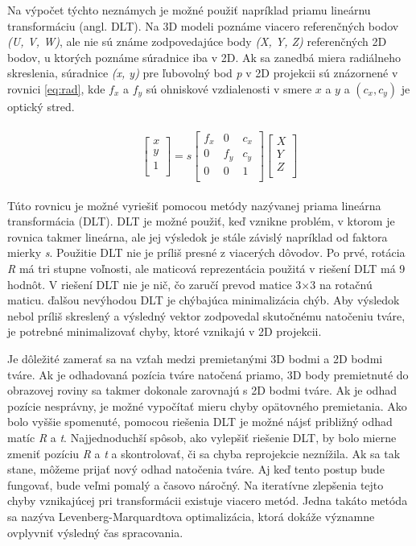 \documentclass[slovak,master,dept460,male,cpp,cpdeclaration]{diploma}
\begin{document}
Na výpočet týchto neznámych je možné použiť napríklad  priamu lineárnu transformáciu (angl. DLT). Na 3D modeli poznáme viacero referenčných bodov \textit{(U, V, W)}, ale  nie sú známe zodpovedajúce body \textit{(X, Y, Z)} referenčných 2D bodov, u ktorých poznáme súradnice iba v 2D. Ak sa zanedbá miera radiálneho skreslenia, súradnice  \textit{(x, y)} pre ľubovolný bod \textit{p} v 2D projekcii sú znázornené v rovnici \ref{eq:rad}, kde $f_x$ a $f_y$ sú ohniskové vzdialenosti v smere $x$ a $y$ a $(c_x, c_y)$ je optický stred.


\begin{eqnarray}
\begin{split}
&\ \ \ \ \begin{bmatrix}
x\\ 
y\\ 
1\\
\end{bmatrix}
=  s
\begin{bmatrix}
f_{x} & 0 & c_{x}\\ 
0 & f_{y} & c_{y}\\ 
0 & 0 & 1 \\
\end{bmatrix}
\begin{bmatrix}
X\\ 
Y\\ 
Z\\
\end{bmatrix}
\label{eq:rad}
\end{split}
\end{eqnarray}

Túto rovnicu je možné vyriešiť pomocou metódy nazývanej priama lineárna transformácia (DLT). DLT je možné použiť, keď vznikne problém, v ktorom je rovnica takmer lineárna, ale jej výsledok je stále závislý napríklad od faktora mierky \textit{s}. Použitie DLT nie je príliš presné z viacerých dôvodov. Po prvé, rotácia \textit{R} má tri stupne voľnosti, ale maticová reprezentácia použitá v riešení DLT má 9 hodnôt. V riešení DLT nie je nič, čo zaručí prevod  matice 3$\times$3 na rotačnú maticu. ďalšou nevýhodou DLT je  chýbajúca minimalizácia chýb. Aby výsledok nebol príliš skreslený a výsledný vektor zodpovedal  skutočnému natočeniu tváre, je potrebné minimalizovať chyby, ktoré vznikajú v 2D projekcii. \par
Je dôležité zamerať sa na vzťah medzi premietanými 3D bodmi a 2D bodmi tváre. Ak je odhadovaná pozícia tváre natočená priamo, 3D body premietnuté do obrazovej roviny sa takmer dokonale zarovnajú s 2D bodmi tváre. Ak je odhad pozície nesprávny, je možné vypočítať mieru chyby opätovného premietania. Ako bolo vyššie spomenuté, pomocou riešenia DLT je možné nájsť približný odhad matíc \textit{R} a \textit{t}. Najjednoduchší spôsob, ako vylepšiť riešenie DLT, by bolo mierne zmeniť pozíciu \textit{R} a \textit{t} a skontrolovať, či sa chyba reprojekcie neznížila. Ak sa tak stane, môžeme prijať nový odhad natočenia tváre.  Aj keď tento postup bude fungovať, bude veľmi pomalý a časovo náročný. Na iteratívne zlepšenia  tejto chyby vznikajúcej pri transformácii existuje viacero  metód. Jedna takáto metóda sa nazýva Levenberg-Marquardtova optimalizácia\cite{lourakis2005levenberg}, ktorá dokáže významne ovplyvniť výsledný čas spracovania.
\end{document}
